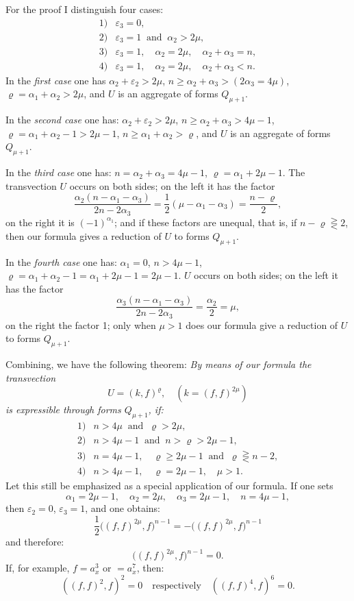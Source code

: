 \documentclass[10pt]{article}
\begin{document}
For the proof I distinguish four cases:
\[
\begin{array}{ll}
1) & \varepsilon_3=0,\\
2) & \varepsilon_3=1\ \text{ and }\ \alpha_2>2\mu,\\
3) & \varepsilon_3=1,\quad \alpha_2=2\mu,\quad \alpha_2+\alpha_3=n,\\
4) & \varepsilon_3=1,\quad \alpha_2=2\mu,\quad \alpha_2+\alpha_3<n.
\end{array}
\]
In the \emph{first case} one has $\alpha_2+\varepsilon_2>2\mu$, $n\geq \alpha_2+\alpha_3>(2\alpha_3=4\mu)$, $\varrho=\alpha_1+\alpha_2>2\mu$, and $U$ is an aggregate of forms $Q_{\mu+1}$.

In the \emph{second case} one has: $\alpha_2+\varepsilon_2>2\mu$, $n\geq\alpha_2+\alpha_3>4\mu-1$, $\varrho=\alpha_1+\alpha_2-1>2\mu-1$, $n\geq\alpha_1+\alpha_2>\varrho$, and $U$ is an aggregate of forms $Q_{\mu+1}$.

In the \emph{third case} one has: $n=\alpha_2+\alpha_3=4\mu-1$, $\varrho=\alpha_1+2\mu-1$. The transvection $U$ occurs on both sides; on the left it has the factor
\[
\frac{\alpha_2(n-\alpha_1-\alpha_3)}{2n-2\alpha_3}=\frac12(\mu-\alpha_1-\alpha_3)=\frac{n-\varrho}{2},
\]
on the right it is $(-1)^{\alpha_1}$; and if these factors are unequal, that is, if $n-\varrho\gtreqless 2$, then our formula gives a reduction of $U$ to forms $Q_{\mu+1}$.

In the \emph{fourth case} one has: $\alpha_1=0$, $n>4\mu-1$, $\varrho=\alpha_1+\alpha_2-1=\alpha_1+2\mu-1=2\mu-1$. $U$ occurs on both sides; on the left it has the factor
\[
\frac{\alpha_3(n-\alpha_1-\alpha_3)}{2n-2\alpha_3}=\frac{\alpha_2}{2}=\mu,
\]
on the right the factor 1; only when $\mu>1$ does our formula give a reduction of $U$ to forms $Q_{\mu+1}$.

Combining, we have the following theorem: \emph{By means of our formula the transvection}
\[
U=(k,f)^\varrho,\quad (k=(f,f)^{2\mu})
\]
\emph{is expressible through forms $Q_{\mu+1}$, if:}
\[
\begin{array}{ll}
1) & n>4\mu\ \text{ and }\ \varrho>2\mu,\\
2) & n>4\mu-1\ \text{ and }\ n>\varrho>2\mu-1,\\
3) & n=4\mu-1,\quad \varrho\geq2\mu-1\ \text{ and }\ \varrho\gtreqless n-2,\\
4) & n>4\mu-1,\quad \varrho=2\mu-1,\quad \mu>1.
\end{array}
\]
Let this still be emphasized as a special application of our formula. If one sets
\[
\alpha_1=2\mu-1,
\quad \alpha_2=2\mu,
\quad \alpha_3=2\mu-1,
\quad n=4\mu-1,
\]
then $\varepsilon_2=0$, $\varepsilon_3=1$, and one obtains:
\[
\frac12\bigl((f,f)^{2\mu},f\bigr)^{n-1}=-\bigl((f,f)^{2\mu},f\bigr)^{n-1}
\]
and therefore:
\[
\bigl((f,f)^{2\mu},f\bigr)^{n-1}=0.
\]
If, for example, $f=a_x^3$ or $=a_x^7$, then:
\[
((f,f)^2,f)^2=0\quad\text{respectively}\quad ((f,f)^4,f)^6=0.
\]
\end{document}
